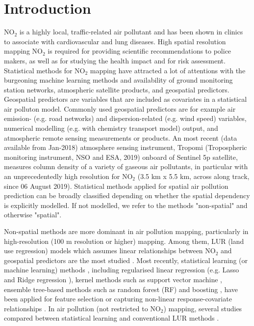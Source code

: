 \documentclass{article}
\begin{document}
\section{Introduction}
NO$_2$ is a highly local, traffic-related air pollutant and has been shown in clinics to associate with cardiovascular and lung diseases. High spatial resolution mapping NO$_2$ is required for providing scientific recommendations to police makers, as well as for studying the health impact and for risk assessment. Statistical methods for NO$_2$ mapping have attracted a lot of attentions with the burgeoning machine learning methods and availability of ground monitoring station networks, atmospheric satellite products, and geospatial predictors. Geospatial predictors are variables that are included as covariates in a statistical air polluton model. Commonly used geospatial predictors are for example air emission- (e.g. road networks) and dispersion-related (e.g. wind speed) variables, numerical modelling (e.g. with chemistry transport model) output, and atmospheric remote sensing measurements or products. An most recent (data available from Jan-2018) atmosphere sensing instrument, Tropomi (Tropospheric monitoring instrument, NSO and ESA, 2019) onboard of Sentinel 5p satellite, measures column density of a variety of gaseous air pollutants, in particular with an unprecedentedly high resolution for NO$_2$ (3.5 km x 5.5 km, across along track, since 06 August 2019). Statistical methods applied for spatial air pollution prediction can be broadly classified depending on whether the spatial dependency is explicitly modelled. If not modelled, we refer to the methods "non-spatial" and otherwise "spatial". 

Non-spatial methods are more dominant in air pollution mapping, particularly in high-resolution (100 m resolution or higher) mapping. Among them, LUR (land use regression) models which assumes linear relationships between NO$_2$ and geospatial predictors are the most studied \citep{briggs2000regression,hoek2008review}. Most recently, statistical learning (or machine learning) methods \citep{hastie2009elements}, including regularised linear regression (e.g. Lasso and Ridge regression \citep{James2013introduction}), kernel methods such as support vector machine \citep{svm1999least}, ensemble tree-based methods such as random forest (RF) \citep{breiman2001random} and boosting \citep{chen2016xgboost}, have been applied for feature selection or capturing non-linear response-covariate relationships \citep{luglobal,chen2019comparison}. In air pollution (not restricted to NO$_2$) mapping, several studies compared between statistical learning and conventional LUR methods  \citep{chen2019comparison,kerckhoffs2019performance,luglobal,REN2020105827,machinereview}.
\end{document}
